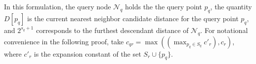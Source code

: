 


In this formulation, the query node $\mathscr{N}_q$ holds the the query point
$p_q$, the quantity $D[p_q]$ is the current nearest neighbor candidate distance
for the query point $p_q$, and $2^{s_q + 1}$ corresponds to the furthest
descendant distance of $\mathscr{N}_q$.  For notational convenience in the
following proof, take $c_{qr} = \max((\max_{p_q \in S_q} c'_r), c_r)$, where
$c'_r$ is the expansion constant of the set $S_r \cup \{ p_q \}$.



